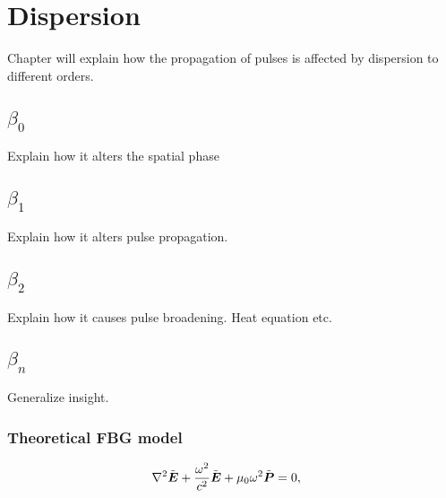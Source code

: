 \chapter{Dispersion}
\label{ch:Dispersion}
Chapter will explain how the propagation of pulses is affected by dispersion to different orders.



\section{$\beta_0$}
Explain how it alters the spatial phase
\section{$\beta_1$}
Explain how it alters pulse propagation. 
\section{$\beta_2$}
Explain how it causes pulse broadening. Heat equation etc.
\section{$\beta_n$}
Generalize insight.


\subsection{Theoretical FBG model}

\begin{align}
    \nabla^{2}\tilde{\boldsymbol{E}}+\frac{\omega^{2}}{c^{2}}\tilde{\boldsymbol{E}}+\text{\ensuremath{\mu_{0}}}\omega^{2}\tilde{\boldsymbol{P}}&=0,
\end{align}
